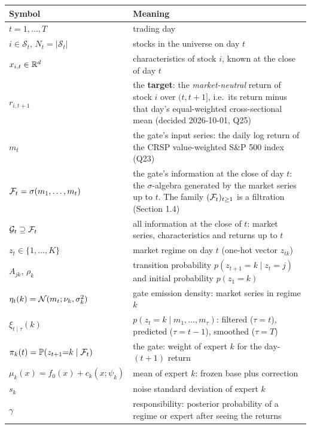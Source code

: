 \begin{center}
\renewcommand{\arraystretch}{1.25}
\begin{tabularx}{\textwidth}{@{}lX@{}}
\toprule
Symbol & Meaning \\
\midrule
$t = 1,\dots,T$ & trading day \\
$i \in \mathcal S_t$, $N_t = |\mathcal S_t|$ & stocks in the universe on day $t$ \\
$x_{i,t}\in\mathbb{R}^d$ & characteristics of stock $i$, known at the close of day $t$ \\
$r_{i,t+1}$ & the \textbf{target}: the \emph{market-neutral} return of stock $i$ over $(t,t+1]$, i.e.\ its return minus that day's equal-weighted cross-sectional mean (decided 2026-10-01, Q25) \\
$m_t$ & the gate's input series: the daily log return of the CRSP value-weighted S\&P 500 index (Q23) \\
$\mathcal{F}_t=\sigma(m_1,\dots,m_t)$ & the gate's information at the close of day $t$: the $\sigma$-algebra generated by the market series up to $t$. The family $(\mathcal{F}_t)_{t\ge1}$ is a filtration (Section 1.4) \\
$\mathcal G_t\supseteq\mathcal{F}_t$ & all information at the close of $t$: market series, characteristics and returns up to $t$ \\
$z_t\in\{1,\dots,K\}$ & market regime on day $t$ (one-hot vector $z_{tk}$) \\
$A_{jk}$, $\rho_k$ & transition probability $p(z_{t+1}{=}k\mid z_t{=}j)$ and initial probability $p(z_1{=}k)$ \\
$\eta_t(k)=\mathcal{N}(m_t;\nu_k,\sigma_k^2)$ & gate emission density: market series in regime $k$ \\
$\xi_{t\mid\tau}(k)$ & $p(z_t{=}k\mid m_1,\dots,m_\tau)$: filtered ($\tau=t$), predicted ($\tau=t-1$), smoothed ($\tau=T$) \\
$\pi_k(t)=\mathbb P(z_{t+1}{=}k\mid\mathcal{F}_t)$ & the gate: weight of expert $k$ for the day-$(t{+}1)$ return \\
$\mu_k(x)=f_0(x)+c_k(x;\psi_k)$ & mean of expert $k$: frozen base plus correction \\
$s_k$ & noise standard deviation of expert $k$ \\
$\gamma$ & responsibility: posterior probability of a regime or expert after seeing the returns \\
\bottomrule
\end{tabularx}
\end{center}

